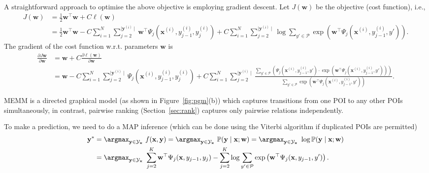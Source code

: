 A straightforward approach to optimise the above objective is employing gradient descent. 
Let $J(\mathbf{w})$ be the objective (cost function), i.e.,
\begin{align*}
J(\mathbf{w}) 
&= \frac{1}{2} \mathbf{w}^\top \mathbf{w} + C \ell(\mathbf{w}) \\
&= \frac{1}{2} \mathbf{w}^\top \mathbf{w} -
   C \sum_{i=1}^N \sum_{j=2}^{\mid \mathbf{y}^{(i)} \mid} \mathbf{w}^\top \Psi_j(\mathbf{x}^{(i)}, y_{j-1}^{(i)}, y_j^{(i)}) +
   C \sum_{i=1}^N \sum_{j=2}^{\mid \mathbf{y}^{(i)} \mid} \log \sum_{y' \in \mathcal{P}} 
     \exp \left(\mathbf{w}^\top \Psi_j(\mathbf{x}^{(i)}, y_{j-1}^{(i)}, y') \right).
\end{align*}
The gradient of the cost function w.r.t. parameters $\mathbf{w}$ is
\begin{align*}
\frac{\partial J{\mathbf{w}}}{\partial \mathbf{w}}
&= \mathbf{w} + C \frac{\partial \ell(\mathbf{w})}{\partial \mathbf{w}} \\
&= \mathbf{w} - C \sum_{i=1}^N \sum_{j=2}^{\mid \mathbf{y}^{(i)} \mid} \Psi_j(\mathbf{x}^{(i)}, y_{j-1}^{(i)}, y_j^{(i)}) +
   C \sum_{i=1}^N \sum_{j=2}^{\mid \mathbf{y}^{(i)} \mid} 
     \frac{\sum_{y' \in \mathcal{P}} \left( \Psi_j(\mathbf{x}^{(i)}, y_{j-1}^{(i)}, y') \cdot 
           \exp \left(\mathbf{w}^\top \Psi_j(\mathbf{x}^{(i)}, y_{j-1}^{(i)}, y') \right) \right)}
          {\sum_{y' \in \mathcal{P}} \exp \left(\mathbf{w}^\top \Psi_j(\mathbf{x}^{(i)}, y_{j-1}^{(i)}, y') \right)}.
\end{align*}


MEMM is a directed graphical model (as shown in Figure~\ref{fig:pgm}(b)) which captures transitions from one POI to any other POIs simultaneously, 
in contrast, pairwise ranking (Section~\ref{sec:rank}) captures only pairwise relations independently.

To make a prediction, we need to do a MAP inference (which can be done using the Viterbi algorithm if duplicated POIs are permitted)
\begin{equation}
\label{eq:testmemm}
\begin{aligned}
\mathbf{y}^* 
&= \argmax_{\mathbf{y} \in \mathcal{Y}_\mathbf{x}}~f(\mathbf{x}, \mathbf{y})
 = \argmax_{\mathbf{y} \in \mathcal{Y}_\mathbf{x}}~\mathbb{P}(\mathbf{y} \mid \mathbf{x}; \mathbf{w})
 = \argmax_{\mathbf{y} \in \mathcal{Y}_\mathbf{x}}~\log \mathbb{P}(\mathbf{y} \mid \mathbf{x}; \mathbf{w}) \\
&= \argmax_{\mathbf{y} \in \mathcal{Y}_\mathbf{x}}~\sum_{j=2}^{K} \mathbf{w}^\top \Psi_j(\mathbf{x}, y_{j-1}, y_j) - 
   \sum_{j=2}^{K} \log \sum_{y' \in \mathcal{P}} \exp \left(\mathbf{w}^\top \Psi_j(\mathbf{x}, y_{j-1}, y') \right).
\end{aligned}
\end{equation}


